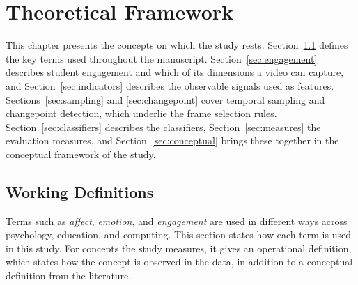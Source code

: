 %
%
%

\chapter{Theoretical Framework}
\label{sec:theoframework}

This chapter presents the concepts on which the study rests. Section~\ref{sec:definitions} defines the key terms used throughout the manuscript. Section~\ref{sec:engagement} describes student engagement and which of its dimensions a video can capture, and Section~\ref{sec:indicators} describes the observable signals used as features. Sections~\ref{sec:sampling} and \ref{sec:changepoint} cover temporal sampling and changepoint detection, which underlie the frame selection rules. Section~\ref{sec:classifiers} describes the classifiers, Section~\ref{sec:measures} the evaluation measures, and Section~\ref{sec:conceptual} brings these together in the conceptual framework of the study.



\section{Working Definitions}
\label{sec:definitions}

Terms such as \emph{affect}, \emph{emotion}, and \emph{engagement} are used in different ways across psychology, education, and computing. This section states how each term is used in this study. For concepts the study measures, it gives an operational definition, which states how the concept is observed in the data, in addition to a conceptual definition from the literature.

